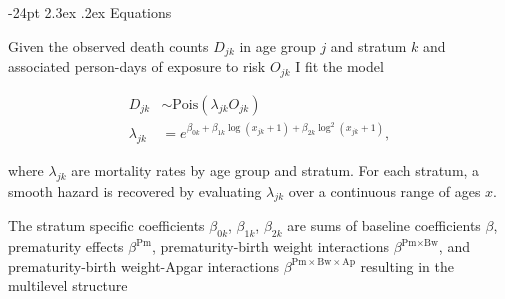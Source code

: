 \documentclass[10pt,twoside,reqno]{article}
\makeatletter
\renewcommand\section{\@startsection {section}{1}{\z@}%
                                   {-24pt}%
                                   {2.3ex \@plus.2ex}%
                                   {\normalfont\large\bfseries}}
\makeatother
\begin{document}
\hypertarget{equations}{%
\section{Equations}\label{equations}}

Given the observed death counts \(D_{jk}\) in age group \(j\) and stratum \(k\) and associated person-days of exposure to risk \(O_{jk}\) I fit the model

\begin{equation}
  \begin{aligned}
    D_{jk} &\sim \text{Pois}\left(\lambda_{jk}O_{jk}\right) \\
    \lambda_{jk} &= e^{\beta_{0k} +
    \beta_{1k}\log(x_{jk}+1) +
    \beta_{2k}\log^2(x_{jk}+1)},
  \end{aligned}
\label{eq:themodel}
\end{equation}

where \(\lambda_{jk}\) are mortality rates by age group and stratum. For each stratum, a smooth hazard is recovered by evaluating \(\lambda_{jk}\) over a continuous range of ages \(x\).

The stratum specific coefficients \(\beta_{0k}\), \(\beta_{1k}\), \(\beta_{2k}\) are sums of baseline coefficients \(\beta\), prematurity effects \(\beta^\text{Pm}\), prematurity-birth weight interactions \(\beta^{\text{Pm}\times\text{Bw}}\), and prematurity-birth weight-Apgar interactions \(\beta^{\text{Pm}\times\text{Bw}\times\text{Ap}}\) resulting in the multilevel structure
\end{document}
